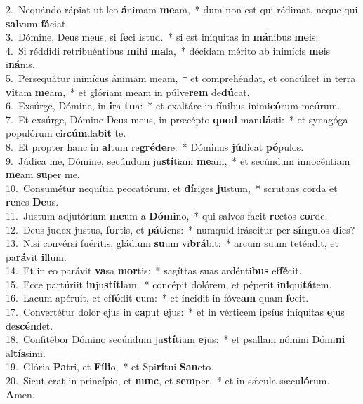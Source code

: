 {2.~}Nequándo rápiat ut leo \textbf{á}nimam \textbf{me}am,~* dum non est qui rédimat, neque qui \textbf{sal}vum \textbf{fá}ciat.\\
{3.~}Dómine, Deus meus, si \textbf{fe}ci \textbf{i}stud.~* si est iníquitas in \textbf{má}nibus \textbf{me}is:\\
{4.~}Si réddidi retribuéntibus \textbf{mi}hi \textbf{ma}la,~* décidam mérito ab inimícis \textbf{me}is i\textbf{ná}nis.\\
{5.~}Persequátur inimícus ánimam meam,~† et comprehéndat, et concúlcet in terra \textbf{vi}tam \textbf{me}am,~* et glóriam meam in púlve\textbf{rem} de\textbf{dú}cat.\\
{6.~}Exsúrge, Dómine, in \textbf{i}ra \textbf{tu}a:~* et exaltáre in fínibus inimi\textbf{có}rum me\textbf{ó}rum.\\
{7.~}Et exsúrge, Dómine Deus meus, in præcépto \textbf{quod} man\textbf{dá}sti:~* et synagóga populórum cir\textbf{cúm}da\textbf{bit} te.\\
{8.~}Et propter hanc in \textbf{al}tum re\textbf{gré}\textbf{de}re:~* Dóminus \textbf{jú}dicat \textbf{pó}pulos.\\
{9.~}Júdica me, Dómine, secúndum ju\textbf{stí}tiam \textbf{me}am,~* et secúndum innocéntiam \textbf{me}am \textbf{su}per me.\\
{10.~}Consumétur nequítia peccatórum, et \textbf{dí}riges \textbf{ju}stum,~* scrutans corda et \textbf{re}nes \textbf{De}us.\\
{11.~}Justum adjutórium \textbf{me}um a \textbf{Dó}\textbf{mi}no,~* qui salvos facit \textbf{re}ctos \textbf{cor}de.\\
{12.~}Deus judex justus, \textbf{for}tis, et \textbf{pá}\textbf{ti}ens:~* numquid iráscitur per \textbf{sín}gulos \textbf{di}es?\\
{13.~}Nisi convérsi fuéritis, gládium \textbf{su}um vi\textbf{brá}bit:~* arcum suum teténdit, et pa\textbf{rá}vit \textbf{il}lum.\\
{14.~}Et in eo parávit \textbf{va}sa \textbf{mor}tis:~* sagíttas suas ardénti\textbf{bus} ef\textbf{fé}cit.\\
{15.~}Ecce partúriit \textbf{in}ju\textbf{stí}\textbf{ti}am:~* concépit dolórem, et péperit i\textbf{ni}qui\textbf{tá}tem.\\
{16.~}Lacum apéruit, et ef\textbf{fó}dit \textbf{e}um:~* et íncidit in fóve\textbf{am} quam \textbf{fe}cit.\\
{17.~}Convertétur dolor ejus in \textbf{ca}put \textbf{e}jus:~* et in vérticem ipsíus iníquitas \textbf{e}jus de\textbf{scén}det.\\
{18.~}Confitébor Dómino secúndum ju\textbf{stí}tiam \textbf{e}jus:~* et psallam nómini Dómi\textbf{ni} al\textbf{tís}simi.\\
{19.~}Glória \textbf{Pa}tri, et \textbf{Fí}\textbf{li}o,~* et Spi\textbf{rí}tui \textbf{San}cto.\\
{20.~}Sicut erat in princípio, et \textbf{nunc}, et \textbf{sem}per,~* et in sǽcula sæcu\textbf{ló}rum. \textbf{A}men.\\

